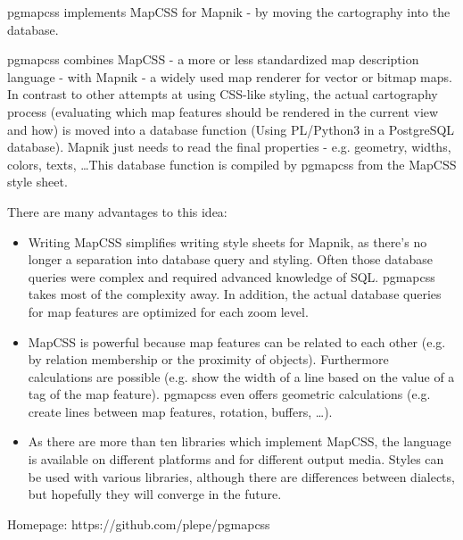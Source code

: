 %
{pgmapcss implements MapCSS for Mapnik - by moving the cartography into the database.}%
{}%
{pgmapcss combines MapCSS - a more or less standardized map description language - with Mapnik - a widely used map renderer for vector or bitmap maps. In contrast to other attempts at using CSS-like styling, the actual cartography process (evaluating which map features should be rendered  in the current view and how) is moved into a database function (Using PL/Python3 in a PostgreSQL database). Mapnik just needs to read the final properties - e.g. geometry, widths, colors, texts, \dots This database function is compiled by pgmapcss from the MapCSS style sheet.

\noindent There are many advantages to this idea:
\begin{itemize}
\item Writing MapCSS simplifies writing style sheets for Mapnik, as there's no longer a separation into database query and styling. Often those database queries were complex and required advanced knowledge of SQL. pgmapcss takes most of the complexity away. In addition, the actual database queries for map features are optimized for each zoom level.
\item MapCSS is powerful because map features can be related to each other (e.g. by relation membership or the proximity of objects). Furthermore calculations are possible (e.g. show the width of a line based on the value of a tag of the map feature). pgmapcss even offers geometric calculations (e.g. create lines between map features, rotation, buffers, …).
\item As there are more than ten libraries which implement MapCSS, the language is available on different platforms and for different output media. Styles can be used with various libraries,  although there are differences between dialects, but hopefully they will converge in the future.
\end{itemize}

Homepage: https://github.com/plepe/pgmapcss}


